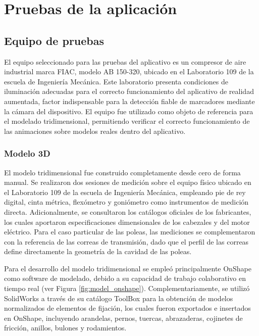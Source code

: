 \section{Pruebas de la aplicación}

    \subsection{Equipo de pruebas}

        El equipo seleccionado para las pruebas del aplicativo es un compresor de aire industrial marca FIAC, modelo AB 150-320, ubicado en el Laboratorio 109 de la escuela de Ingeniería Mecánica. Este laboratorio presenta condiciones de iluminación adecuadas para el correcto funcionamiento del aplicativo de realidad aumentada, factor indispensable para la detección fiable de marcadores mediante la cámara del dispositivo. El equipo fue utilizado como objeto de referencia para el modelado tridimensional, permitiendo verificar el correcto funcionamiento de las animaciones sobre modelos reales dentro del aplicativo.

        

        \subsubsection{Modelo 3D}

            El modelo tridimensional fue construido completamente desde cero de forma manual. Se realizaron dos sesiones de medición sobre el equipo físico ubicado en el Laboratorio 109 de la escuela de Ingeniería Mecánica, empleando pie de rey digital, cinta métrica, flexómetro y goniómetro como instrumentos de medición directa. Adicionalmente, se consultaron los catálogos oficiales de los fabricantes, los cuales aportaron especificaciones dimensionales de los cabezales y del motor eléctrico. Para el caso particular de las poleas, las mediciones se complementaron con la referencia de las correas de transmisión, dado que el perfil de las correas define directamente la geometría de la cavidad de las poleas.

            Para el desarrollo del modelo tridimensional se empleó principalmente OnShape como software de modelado, debido a su capacidad de trabajo colaborativo en tiempo real (ver Figura \ref{fig:model_onshape}). Complementariamente, se utilizó SolidWorks a través de su catálogo ToolBox para la obtención de modelos normalizados de elementos de fijación, los cuales fueron exportados e insertados en OnShape, incluyendo arandelas, pernos, tuercas, abrazaderas, cojinetes de fricción, anillos, bulones y rodamientos.

